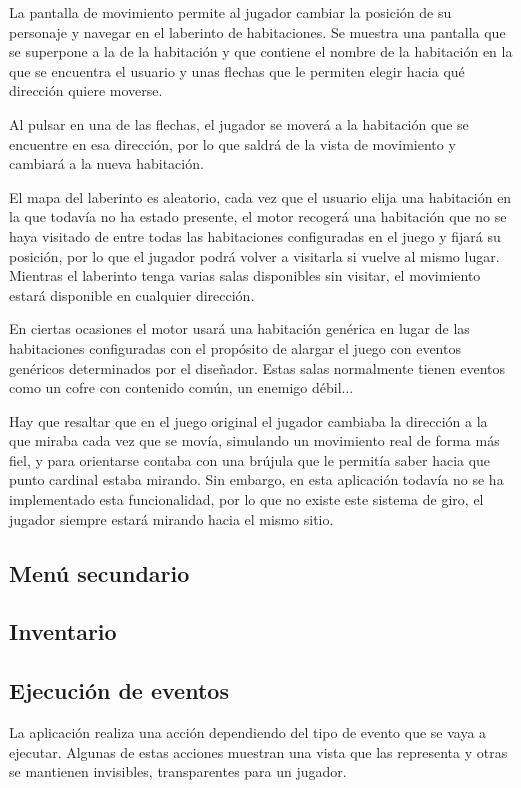 La pantalla de movimiento permite al jugador cambiar la posición de su personaje y navegar en el laberinto de habitaciones.
Se muestra una pantalla que se superpone a la de la habitación y que contiene el nombre de la habitación en la que se encuentra el usuario y unas flechas que le permiten elegir hacia qué dirección quiere moverse.

Al pulsar en una de las flechas, el jugador se moverá a la habitación que se encuentre en esa dirección, por lo que saldrá de la vista de movimiento y cambiará a la nueva habitación.

El mapa del laberinto es aleatorio, cada vez que el usuario elija una habitación en la que todavía no ha estado presente, el motor recogerá una habitación que no se haya visitado de entre todas las habitaciones configuradas en el juego y fijará su posición, por lo que el jugador podrá volver a visitarla si vuelve al mismo lugar.
Mientras el laberinto tenga varias salas disponibles sin visitar, el movimiento estará disponible en cualquier dirección.
 
En ciertas ocasiones el motor usará una habitación genérica en lugar de las habitaciones configuradas con el propósito de alargar el juego con eventos genéricos determinados por el diseñador. Estas salas normalmente tienen eventos como un cofre con contenido común, un enemigo débil...

Hay que resaltar que en el juego original el jugador cambiaba la dirección a la que miraba cada vez que se movía, simulando un movimiento real de forma más fiel, y para orientarse contaba con una brújula que le permitía saber hacia que punto cardinal estaba mirando.
Sin embargo, en esta aplicación todavía no se ha implementado esta funcionalidad, por lo que no existe este sistema de giro, el jugador siempre estará mirando hacia el mismo sitio.

\subsection{Menú secundario}

\subsection{Inventario}

\subsection{Ejecución de eventos}
La aplicación realiza una acción dependiendo del tipo de evento que se vaya a ejecutar. Algunas de estas acciones muestran una vista que las representa y otras se mantienen invisibles, transparentes para un jugador.

